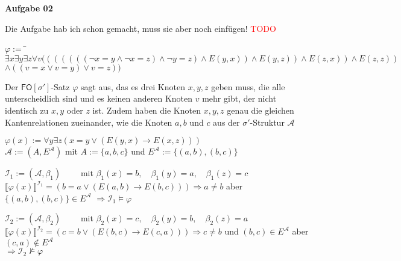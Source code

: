 \documentclass[a4paper,10pt]{article}
\begin{document}
	\textbf{Aufgabe 02}
	\begin{compactenum} [(a)]
		\item Die Aufgabe hab ich schon gemacht, muss sie aber noch einfügen! \textcolor{red}{TODO} \ \\
		\item \begin{tabbing}
			$ \varphi := $ \= $\exists x \exists y \exists z \forall v (((((((\lnot x = y \wedge \lnot x = z) \wedge \lnot y = z) \wedge E(y,x)) \wedge E(y,z)) \wedge E(z,x)) \wedge E(z,z)) $ \\
			\> $\wedge ((v=x \vee v=y )\vee v=z))$
		\end{tabbing}
		Der $\mathsf{FO}[\sigma']$-Satz $ \varphi $ sagt aus, das es drei Knoten $x,y,z$ geben muss, die alle unterscheidlich sind und es keinen anderen Knoten $v$ mehr gibt, der nicht identisch zu $x,y$ oder $z$ ist. Zudem haben die Knoten $x,y,z$ genau die gleichen Kantenrelationen zueinander, wie die Knoten $a,b$ und $c$ aus der $ \sigma'$-Struktur $ \mathcal{A} $ \ \\
		\item $ \varphi(x) := \forall y \exists z (x = y \vee (E(y,x) \rightarrow E(x,z))) $\\
		$ \mathcal{A} := (A, E^\mathcal{A})$ mit $A:= \{a,b,c\}$ und $ E^\mathcal{A} := \{(a,b),(b,c)\} $
		\begin{compactitem}
			\item $ \mathcal{I}_1 :=(\mathcal{A},\beta_1) \qquad $ mit $ \beta_1(x) = b, \quad \beta_1(y) = a, \quad \beta_1(z) = c $\\
			$\llbracket\varphi(x)\rrbracket^{\mathcal{I}_1} =(b=a \vee (E(a,b)\rightarrow E(b,c))) \Rightarrow a \neq b $ aber $ \{(a,b), (b,c)\} \in E^\mathcal{A}$
			$\Rightarrow \mathcal{I}_1 \models \varphi $
			\item $ \mathcal{I}_2 :=(\mathcal{A},\beta_2) \qquad $ mit $ \beta_2(x) = c, \quad \beta_2(y) = b, \quad \beta_2(z) = a $\\
			$\llbracket\varphi(x)\rrbracket^{\mathcal{I}_2} =(c=b \vee (E(b,c)\rightarrow E(c,a))) \Rightarrow c \neq b $ und $ (b,c) \in E^\mathcal{A} $ aber $ (c,a) \not\in E^\mathcal{A} $\\
			$ \Rightarrow \mathcal{I}_2 \not\models \varphi $
		\end{compactitem}
	\end{compactenum} \
	
\end{document}
